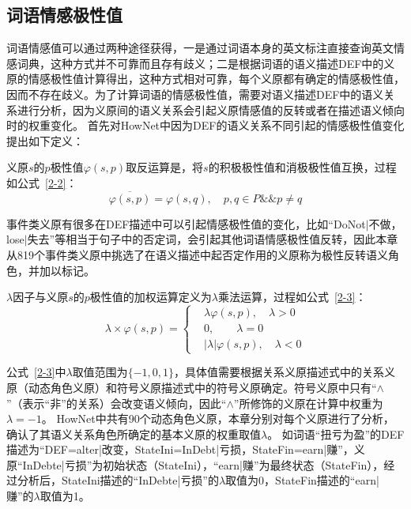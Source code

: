 \subsection{词语情感极性值}
词语情感值可以通过两种途径获得，一是通过词语本身的英文标注直接查询英文情感词典，这种方式并不可靠而且存有歧义；二是根据词语的语义描述DEF中的义原的情感极性值计算得出，这种方式相对可靠，每个义原都有确定的情感极性值，因而不存在歧义。为了计算词语的情感极性值，需要对语义描述DEF中的语义关系进行分析，因为义原间的语义关系会引起义原情感值的反转或者在描述语义倾向时的权重变化。
首先对HowNet中因为DEF的语义关系不同引起的情感极性值变化提出如下定义：
\begin{definition}[情感极性值反转]
义原$s$的$p$极性值$\varphi(s,p)$取反运算是，将$s$的积极极性值和消极极性值互换，过程如公式~\ref{2-2}：
\begin{equation}
\label{2-2}
\overline{\varphi(s,p)}=\varphi(s,q),\quad p,q \in P\&\& p \neq q
\end{equation}
\end{definition}
事件类义原有很多在DEF描述中可以引起情感极性值的变化，比如“DoNot$ | $不做，lose$ | $失去”等相当于句子中的否定词，会引起其他词语情感极性值反转，因此本章从819个事件类义原中挑选了在语义描述中起否定作用的义原称为极性反转语义角色，并加以标记。
\begin{definition}[情感极性值加权]
 $\lambda$因子与义原$s$的$p$极性值的加权运算定义为$\lambda$乘法运算，过程如公式~\ref{2-3}：
\begin{equation}
\label{2-3}
\lambda \times \varphi(s,p) =\begin{cases}
& \lambda \varphi(s,p), \quad  \lambda >0\\
& 0, \quad\quad  \lambda=0\\
&|\lambda|\varphi(s,p), \quad  \lambda <0
\end{cases}
\end{equation}
\end{definition}

公式~\ref{2-3}中$\lambda$取值范围为$ \{-1,0,1\} $，具体值需要根据关系义原描述式中的关系义原（动态角色义原）和符号义原描述式中的符号义原确定。符号义原中只有“$ \wedge$”（表示“非”的关系）会改变语义倾向，因此“$ \wedge$”所修饰的义原在计算中权重为$\lambda=-1$。
HowNet中共有90个动态角色义原，本章分别对每个义原进行了分析，确认了其语义关系角色所确定的基本义原的权重取值$\lambda$。
如词语“扭亏为盈”的DEF描述为“DEF=alter|改变，StateIni=InDebt|亏损，StateFin=earn|赚”，义原“InDebte|亏损”为初始状态（StateIni），“earn|赚”为最终状态（StateFin），经过分析后，StateIni描述的“InDebte|亏损”的$\lambda$取值为0，StateFin描述的“earn|赚”的$\lambda$取值为1。

